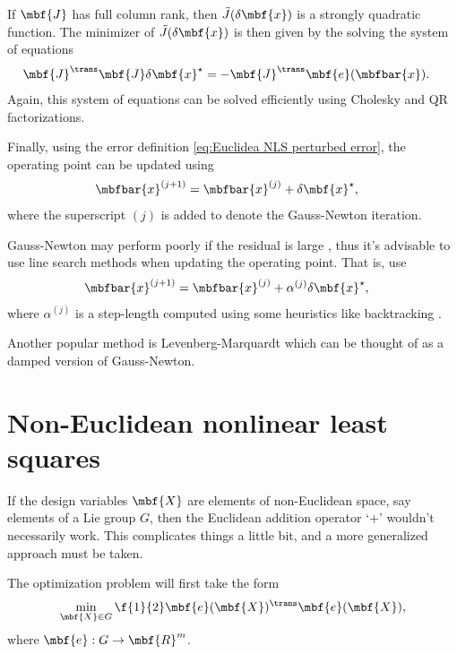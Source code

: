 \documentclass[ nobib, nofonts, notoc]{tufte-handout}
\begin{document}
    If $\mbf{J}$ has full column rank, then $\tilde{J}(\delta\mbf{x})$ is a strongly quadratic function. The minimizer of $\tilde{J}(\delta\mbf{x})$ is then given by the solving the system of equations
    \begin{align}
        \mbf{J}^{\trans}\mbf{J}\delta\mbf{x}^{\star} &= -\mbf{J}^{\trans}\mbf{e}(\mbfbar{x}).
    \end{align}
    Again, this system of equations can be solved efficiently using Cholesky and QR factorizations.

    Finally, using the error definition \eqref{eq:Euclidea NLS perturbed error}, the operating point can be updated using
    \begin{align}
        \mbfbar{x}^{(j+1)} &= \mbfbar{x}^{(j)} + \delta\mbf{x}^{\star},
    \end{align}
    where the superscript $(j)$ is added to denote the Gauss-Newton iteration.

    Gauss-Newton may perform poorly if the residual is large \cite{Nocedal_Numerical_2006,Fletcher_Practical_1987}, thus it's advisable to use line search methods when updating the operating point. That is, use
    \begin{align}
        \mbfbar{x}^{(j+1)} &= \mbfbar{x}^{(j)} + \alpha^{(j)}\delta\mbf{x}^{\star},
    \end{align}
    where $\alpha^{(j)}$ is a step-length computed using some heuristics like backtracking \cite{Nocedal_Numerical_2006}.

    Another popular method is Levenberg-Marquardt \cite{Dellaert_Factor_2017,Nocedal_Numerical_2006} which can be thought of as a damped version of Gauss-Newton.

    
    \section{Non-Euclidean nonlinear least squares}
    If the design variables $\mbf{X}$ are elements of non-Euclidean space, say elements of a Lie group $G$, then the Euclidean addition operator `$+$' wouldn't necessarily work.
    This complicates things a little bit, and a more generalized approach must be taken.
    
    The optimization problem will first take the form
    \begin{align}
        \min_{\mbf{X}\in G} \f{1}{2}\mbf{e}(\mbf{X})^{\trans}\mbf{e}(\mbf{X}),
    \end{align}
    where $\mbf{e} : G \to \mbf{R}^{m}$. 
\end{document}
